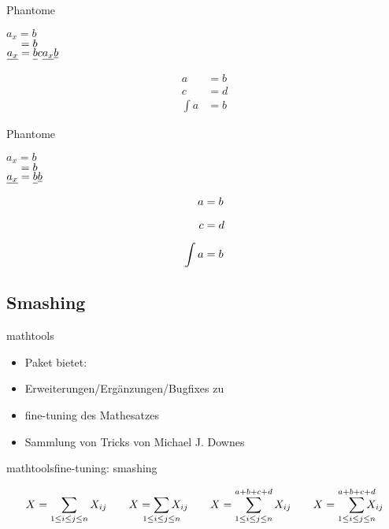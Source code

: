 \documentclass[
	vorläufig=false,
	datum=2018-11-12,
	titel={Mathematiksatz II},
	web=true,
	max,
	aspectratio=1610,
]{../tex/latexkurs-slides}
\begin{document}
\begin{frame}[fragile]{Phantome}
\begin{LTXexample}[width=.4\textwidth]
\(a_x = b\)\\
\(\hphantom{a_x} = b\)\\
\(\underline{a_x} = \underline{b\vphantom{a_x}} c \underline{a_x} \underline b\)
\end{LTXexample}
\begin{LTXexample}
\begin{align*}
a &= b\\
c &= d\\
\int a &= b
\end{align*}
\end{LTXexample}
\end{frame}

\begin{frame}[fragile]{Phantome}
\begin{LTXexample}[width=.4\textwidth]
\(a_x = b\)\\
\(\hphantom{a_x} = b\)\\
\(\underline{a_x} = \underline{b\vphantom{a_x}}\underline b\)
\end{LTXexample}
\begin{LTXexample}
\begin{align*}
a &= b\\
\vphantom{\int} c &= d\\
\int a &= b
\end{align*}
\end{LTXexample}
\end{frame}


\subsection{Smashing}
\begin{frame}{mathtools}
\begin{itemize}
\item Paket  bietet:
\item Erweiterungen/Ergänzungen/Bugfixes zu 
\item fine-tuning des Mathesatzes
\item Sammlung von Tricks von Michael J. Downes
\end{itemize}
\end{frame}

\begin{frame}[fragile]{mathtools}{fine-tuning: smashing}
\begin{LTXexample}[pos=t]
\[
  X = \sum_{1\le i\le j\le n} X_{ij} \qquad
  X = \sum_{\mathclap{1\le i\le j\le n}} X_{ij} \qquad
  X = \sum_{\mathclap{1\le i\le j\le n}}^{a+b+c+d} X_{ij} \qquad
  X = \smashoperator[r]{\sum_{1\le i\le j\le n}^{a+b+c+d}} X_{ij}
\]
\end{LTXexample}
\end{frame}
\end{document}
